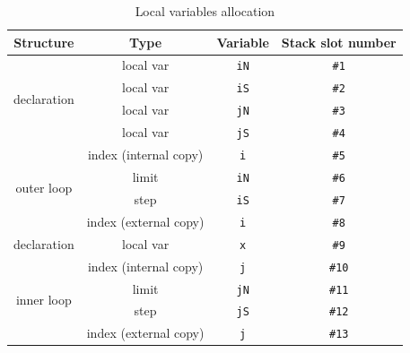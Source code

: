 \begin{table}[H]
    \centering
    \begin{tabular}{|c|c|c|c|}
        \hline
            Structure & Type & Variable & Stack slot number\\
        \hline
        \multirow{4}{*}{declaration} & local var & \texttt{iN} & \texttt{\#1} \\
        & local var & \texttt{iS} & \texttt{\#2} \\
        & local var & \texttt{jN} & \texttt{\#3} \\
        & local var & \texttt{jS} & \texttt{\#4} \\
       
        \hline
        \multirow{4}{*}{outer loop} & index \footnotesize{(internal copy)} & \texttt{i} & \texttt{\#5}\\
        & limit & \texttt{iN} & \texttt{\#6} \\
        & step & \texttt{iS} & \texttt{\#7} \\
        & index \footnotesize{(external copy)} & \texttt{i} & \texttt{\#8} \\
        \hline
        declaration & local var & \texttt{x} & \texttt{\#9} \\
        \hline
        \multirow{4}{*}{inner loop} & index \footnotesize{(internal copy)} & \texttt{j} & \texttt{\#10}\\
        & limit & \texttt{jN} & \texttt{\#11} \\
        & step & \texttt{jS} & \texttt{\#12} \\
        & index \footnotesize{(external copy)} & \texttt{j} & \texttt{\#13} \\
        \hline
    \end{tabular}
    \caption{Local variables allocation}
    \label{tab:allocation-local}
\end{table}

